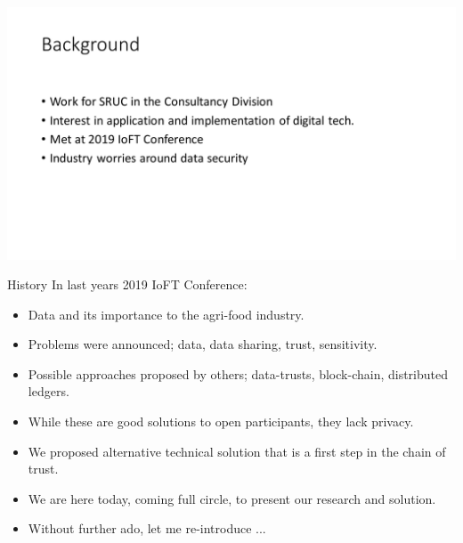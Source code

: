 \documentclass[aspectratio=169]{beamer}
\begin{document}
    \begin{frame}
      \includegraphics[page=2,scale=0.4]{paul.pdf}
    \end{frame}

    \begin{frame}{History}
      In last years 2019 IoFT Conference:
      \begin{itemize}
        \item Data and its importance to the agri-food industry.
        \item Problems were announced; data, data sharing, trust, sensitivity.
        \item Possible approaches proposed by others; data-trusts, block-chain, distributed ledgers.
        \item While these are good solutions to open participants, they lack privacy.
        \item We proposed alternative technical solution that is a first step in the chain of trust.
        \item We are here today, coming full circle, to present our research and solution.
        \item Without further ado, let me re-introduce ...
      \end{itemize}
    \end{frame}
\end{document}
